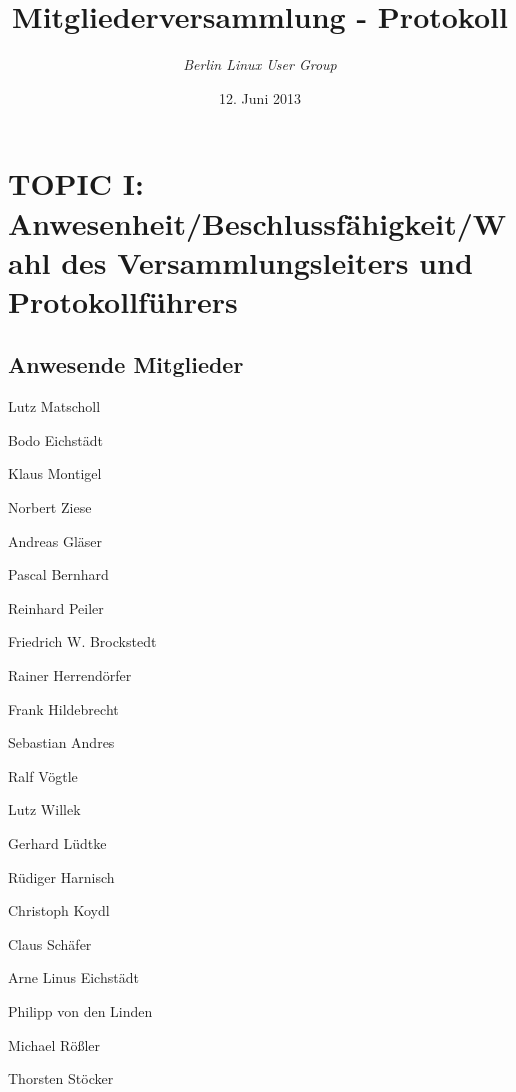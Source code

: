 \documentclass[11pt,a4paper,ngerman]{article}
\title{\textbf{Mitgliederversammlung - Protokoll}}
\author{\emph{Berlin Linux User Group}}
\date{12. Juni 2013}
\begin{document}

\maketitle
\thispagestyle{empty}
\newpage


\setcounter{tocdepth}{2}
\tableofcontents

\newpage




\section{TOPIC I: Anwesenheit/Beschlussfähigkeit/Wahl des Versammlungsleiters 
und Protokollführers}

  \subsection{Anwesende Mitglieder}

    \begin{itemize*}
      \item Lutz Matscholl
      \item Bodo Eichstädt
      \item Klaus Montigel
      \item Norbert Ziese
      \item Andreas Gläser
      \item Pascal Bernhard
      \item Reinhard Peiler
      \item Friedrich W. Brockstedt
      \item Rainer Herrendörfer
      \item Frank Hildebrecht
      \item Sebastian Andres
      \item Ralf Vögtle
      \item Lutz Willek
      \item Gerhard Lüdtke
      \item Rüdiger Harnisch
      \item Christoph Koydl
      \item Claus Schäfer
      \item Arne Linus Eichstädt
      \item Philipp von den Linden
      \item Michael Rößler
      \item Thorsten Stöcker


   \end{itemize*}
\end{document}
